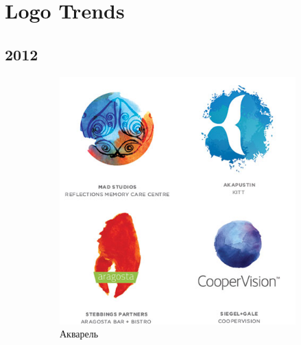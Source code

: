 \section{Logo Trends}
\label{app:logotrends}

\subsection{2012}

\begin{figure}[h!]
  \centering
  \begin{subfigure}{.45\textwidth}
    \centering
    \includegraphics[width=\linewidth]{images/supplement/logolounge/2012/Akvarel'}
    \caption[]{Акварель}
    \label{fig:logolounge:2012:akvarel'}
  \end{subfigure}
  \hfill
  \centering
  \begin{subfigure}{.45\textwidth}
    \centering

\end{subfigure}
\end{figure}
